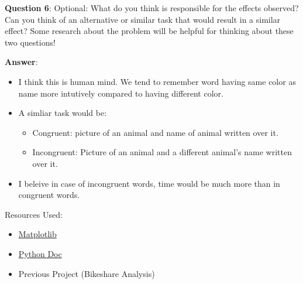 \documentclass[11pt]{article}
\providecommand{\tightlist}{%
      \setlength{\itemsep}{0pt}\setlength{\parskip}{0pt}}
\begin{document}
    \textbf{Question 6}: Optional: What do you think is responsible for the
effects observed? Can you think of an alternative or similar task that
would result in a similar effect? Some research about the problem will
be helpful for thinking about these two questions!

    \textbf{Answer}:

\begin{itemize}
\tightlist
\item
  I think this is human mind. We tend to remember word having same color
  as name more intutively compared to having different color.
\item
  A simliar task would be:

  \begin{itemize}
  \tightlist
  \item
    Congruent: picture of an animal and name of animal written over it.
  \item
    Incongruent: Picture of an animal and a different animal's name
    written over it.
  \end{itemize}
\item
  I beleive in case of incongruent words, time would be much more than
  in congruent words.
\end{itemize}

    Resources Used:

\begin{itemize}
\tightlist
\item
  \href{https://matplotlib.org/api/_as_gen/matplotlib.pyplot.legend.html}{Matplotlib}
\item
  \href{https://docs.python.org/3/library/index.html}{Python Doc}
\item
  Previous Project (Bikeshare Analysis)
\end{itemize}


    
    
    
    
\end{document}
